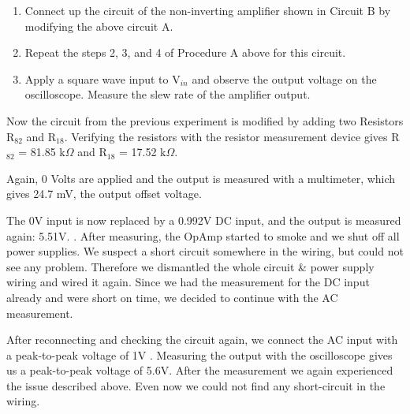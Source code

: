 
\begin{enumerate}
	\item Connect up the circuit of the non-inverting amplifier shown in Circuit B by modifying the
above circuit A.

	\item Repeat the steps 2, 3, and 4 of Procedure A above for this circuit.

	\item Apply a square wave input to V$_{in}$ and observe the output voltage on the oscilloscope.
Measure the slew rate of the amplifier output.
\end{enumerate}

%
%

Now the circuit from the previous experiment is modified by adding two Resistors R$_{82}$ and R$_{18}$. Verifying the resistors with the resistor measurement device gives R$_{82}$ = 81.85 k$\Omega$ and R$_{18}$ = 17.52 k$\Omega$.

Again, 0 Volts are applied and the output is measured with a multimeter, which gives 24.7 mV, the output offset voltage.

The 0V input is now replaced by a 0.992V DC input, and the output is measured again: 5.51V. .
\newline
After measuring, the OpAmp started to smoke and we shut off all power supplies. We suspect a short circuit somewhere in the wiring, but could not see any problem. Therefore we dismantled the whole circuit \& power supply wiring and wired it again.
Since we had the measurement for the DC input already and were short on time, we decided to continue with the AC measurement.

After reconnecting and checking the circuit again, we connect the AC input with a peak-to-peak voltage of 1V . Measuring the output with the oscilloscope gives us a peak-to-peak voltage of 5.6V. After the measurement we again experienced the issue described above. Even now we could not find any short-circuit in the wiring.

